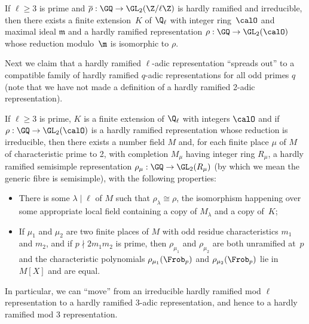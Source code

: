 \begin{theorem}
  \label{hardly-ramified-lifts}
  If $\ell\geq3$ is prime and $\overline{\rho}:\GQ\to\GL_2(\Z/\ell\Z)$
  is hardly ramified and irreducible, then there exists a finite extension~$K$ of $\Q_\ell$
  with integer ring~$\calO$ and maximal ideal $\mathfrak{m}$
  and a hardly ramified representation
  $\rho:\GQ\to\GL_2(\calO)$ whose reduction modulo~$\m$ is isomorphic to $\rho$.
\end{theorem}

Next we claim that a hardly ramified $\ell$-adic representation ``spreads out'' to a compatible
family of hardly ramified $q$-adic representations for all odd primes $q$ (note that we have
not made a definition of a hardly ramified 2-adic representation).

\begin{theorem}
  \label{hardly-ramified-spreads-out}
  If $\ell\geq3$ is prime, $K$ is a finite extension of $\Q_\ell$
  with integers $\calO$ and if $\rho:\GQ\to\GL_2(\calO)$ is a hardly ramified representation
  whose reduction is irreducible,
  then there exists a number field $M$ and, for each finite place $\mu$ of $M$
  of characteristic prime to 2, with completion $M_\mu$ having integer ring $R_\mu$,
  a hardly ramified semisimple representation $\rho_\mu:\GQ\to\GL_2(R_\mu)$ (by which we
  mean the generic fibre is semisimple), with the following properties:
  \begin{itemize}
    \item There is some $\lambda\mid\ell$ of $M$ such that $\rho_\lambda\cong\rho$,
      the isomorphism happening over some appropriate local field containing a copy
      of $M_\lambda$ and a copy of~$K$;
    \item If $\mu_1$ and $\mu_2$ are two finite places of $M$ with odd residue characteristics $m_1$
      and $m_2$, and if $p\nmid 2m_1m_2$ is prime, then $\rho_{\mu_1}$ and $\rho_{\mu_2}$
      are both unramified at~$p$ and the characteristic polynomials $\rho_{\mu_1}(\Frob_p)$
      and $\rho_{\mu_2}(\Frob_p)$ lie in $M[X]$ and are equal.
  \end{itemize}
\end{theorem}

In particular, we can ``move'' from an irreducible hardly ramified mod $\ell$ representation
to a hardly ramified 3-adic representation, and hence to a hardly ramified mod 3 representation.

